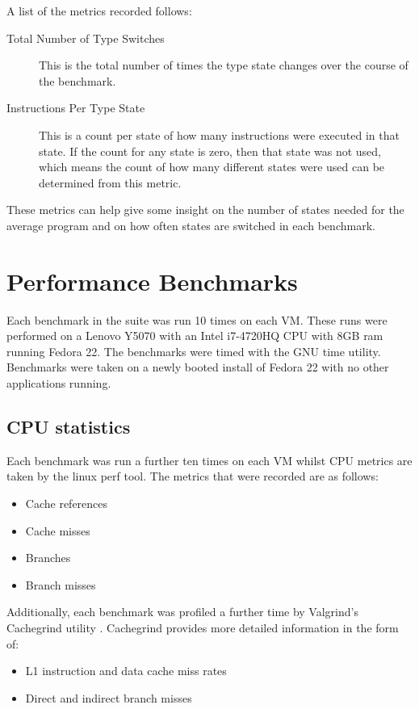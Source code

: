 \documentclass[english,a4paper,12pt]{report}
\begin{document}
A list of the metrics recorded follows:
\begin{description}
\item[Total Number of Type Switches] This is the total number of times
  the type state changes over the course of the benchmark.
\item[Instructions Per Type State] This is a count per state of how
  many instructions were executed in that state. If the count for any
  state is zero, then that state was not used, which means the count
  of how many different states were used can be determined from this
  metric.
\end{description}

These metrics can help give some insight on the number of states
needed for the average program and on how often states are switched in
each benchmark.


\section{Performance Benchmarks}

Each benchmark in the suite was run 10 times on each VM. These runs
were performed on a Lenovo Y5070 with an Intel i7-4720HQ CPU with 8GB
ram running Fedora 22. The benchmarks were timed with the GNU time
utility. Benchmarks were taken on a newly booted install of Fedora 22
with no other applications running.

\subsection{CPU statistics}

Each benchmark was run a further ten times on each VM whilst CPU
metrics are taken by the linux perf tool. The metrics that were
recorded are as follows:

\begin{itemize}
\item Cache references
\item Cache misses
\item Branches
\item Branch misses
\end{itemize}

Additionally, each benchmark was profiled a further time by Valgrind's
Cachegrind utility \cite{cachegrind}. Cachegrind provides more
detailed information in the form of:

\begin{itemize}
\item L1 instruction and data cache miss rates
\item Direct and indirect branch misses
\end{itemize}
\end{document}
